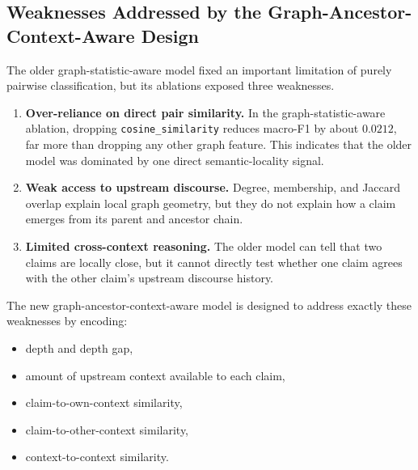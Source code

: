 \documentclass[11pt,a4paper]{article}
\begin{document}
\subsection{Weaknesses Addressed by the Graph-Ancestor-Context-Aware Design}
The older graph-statistic-aware model fixed an important limitation of purely pairwise classification, but its ablations exposed three weaknesses.

\begin{enumerate}[label=\arabic*.]
  \item \textbf{Over-reliance on direct pair similarity.} In the graph-statistic-aware ablation, dropping \texttt{cosine\_similarity} reduces macro-F1 by about \(0.0212\), far more than dropping any other graph feature. This indicates that the older model was dominated by one direct semantic-locality signal.
  \item \textbf{Weak access to upstream discourse.} Degree, membership, and Jaccard overlap explain local graph geometry, but they do not explain how a claim emerges from its parent and ancestor chain.
  \item \textbf{Limited cross-context reasoning.} The older model can tell that two claims are locally close, but it cannot directly test whether one claim agrees with the other claim's upstream discourse history.
\end{enumerate}

The new graph-ancestor-context-aware model is designed to address exactly these weaknesses by encoding:
\begin{itemize}[leftmargin=1.5em]
  \item depth and depth gap,
  \item amount of upstream context available to each claim,
  \item claim-to-own-context similarity,
  \item claim-to-other-context similarity,
  \item context-to-context similarity.
\end{itemize}
\end{document}
